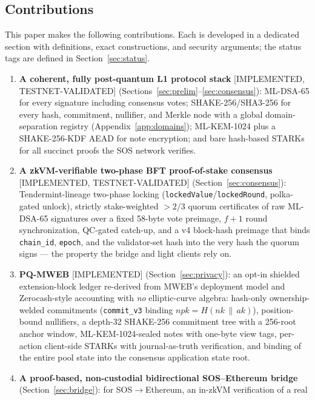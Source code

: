 \documentclass[11pt]{article}
\newcommand{\code}[1]{\texttt{#1}}
\newcommand{\mldsa}{ML\mbox{-}DSA\mbox{-}65}
\newcommand{\mlkem}{ML\mbox{-}KEM\mbox{-}1024}
\newcommand{\shake}{SHAKE\mbox{-}256}
\newcommand{\sha}{SHA3\mbox{-}256}
\newcommand{\concat}{\,\|\,}
\newcommand{\statusI}{\textcolor{statgreen}{\textsf{\scriptsize[IMPLEMENTED]}}}
\newcommand{\statusV}{\textcolor{statgreen}{\textsf{\scriptsize[IMPLEMENTED, TESTNET-VALIDATED]}}}
\theoremstyle{plain}
\theoremstyle{definition}
\theoremstyle{remark}
\begin{document}
\subsection{Contributions}
\label{sec:contributions}

This paper makes the following contributions. Each is developed in a dedicated
section with definitions, exact constructions, and security arguments; the
status tags are defined in Section~\ref{sec:status}.

\begin{enumerate}[leftmargin=1.6em]
\item \textbf{A coherent, fully post-quantum L1 protocol stack} \statusV{}
  (Sections~\ref{sec:prelim}--\ref{sec:consensus}): \mldsa{} for every
  signature including consensus votes; \shake{}/\sha{} for every hash,
  commitment, nullifier, and Merkle node with a global domain-separation
  registry (Appendix~\ref{app:domains}); \mlkem{} plus a \shake{}-KDF AEAD for
  note encryption; and bare hash-based STARKs for all succinct proofs the SOS
  network verifies.
\item \textbf{A zkVM-verifiable two-phase BFT proof-of-stake consensus}
  \statusV{} (Section~\ref{sec:consensus}): Tendermint-lineage two-phase
  locking (\code{lockedValue}/\code{lockedRound}, polka-gated unlock), strictly
  stake-weighted $>\!2/3$ quorum certificates of raw \mldsa{} signatures over a
  fixed 58-byte vote preimage, $f{+}1$ round synchronization, QC-gated
  catch-up, and a v4 block-hash preimage that binds \code{chain\_id},
  \code{epoch}, and the validator-set hash into the very hash the quorum
  signs --- the property the bridge and light clients rely on.
\item \textbf{PQ-MWEB} \statusI{} (Section~\ref{sec:privacy}): an opt-in
  shielded extension-block ledger re-derived from MWEB's deployment model
  \cite{mweb2020} and Zerocash-style accounting \cite{zerocash2014} with
  \emph{no} elliptic-curve algebra: hash-only ownership-welded commitments
  (\code{commit\_v3} binding $\mathit{npk} = H(\mathit{nk} \concat
  \mathit{ak})$), position-bound nullifiers, a depth-32 \shake{} commitment
  tree with a 256-root anchor window, \mlkem{}-sealed notes with one-byte view
  tags, per-action client-side STARKs with journal-as-truth verification, and
  binding of the entire pool state into the consensus application state root.
\item \textbf{A proof-based, non-custodial bidirectional SOS--Ethereum bridge}
  (Section~\ref{sec:bridge}): for SOS$\to$Ethereum, an in-zkVM verification of a real

\end{enumerate}
\end{document}
